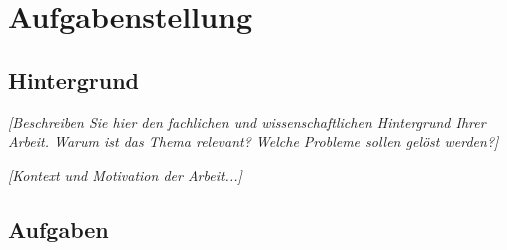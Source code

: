 

\clearpage
\cleardoublepage

\begingroup
\let\cleardoublepage\relax
\let\clearpage\relax

\verzeichnislogo

\chapter*{Aufgabenstellung}

\section*{Hintergrund}
\textit{[Beschreiben Sie hier den fachlichen und wissenschaftlichen Hintergrund Ihrer Arbeit. Warum ist das Thema relevant? Welche Probleme sollen gelöst werden?]}

\textit{[Kontext und Motivation der Arbeit...]}

\newpage

\section*{Aufgaben}

